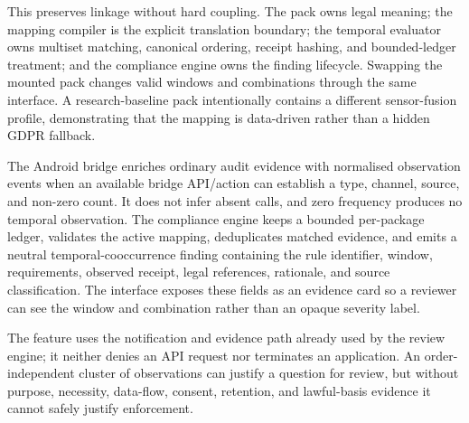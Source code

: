 This preserves linkage without hard coupling. The pack owns legal meaning; the mapping compiler is the explicit translation boundary; the temporal evaluator owns multiset matching, canonical ordering, receipt hashing, and bounded-ledger treatment; and the compliance engine owns the finding lifecycle. Swapping the mounted pack changes valid windows and combinations through the same interface. A research-baseline pack intentionally contains a different sensor-fusion profile, demonstrating that the mapping is data-driven rather than a hidden GDPR fallback.

The Android bridge enriches ordinary audit evidence with normalised observation events when an available bridge API/action can establish a type, channel, source, and non-zero count. It does not infer absent calls, and zero frequency produces no temporal observation. The compliance engine keeps a bounded per-package ledger, validates the active mapping, deduplicates matched evidence, and emits a neutral temporal-cooccurrence finding containing the rule identifier, window, requirements, observed receipt, legal references, rationale, and source classification. The interface exposes these fields as an evidence card so a reviewer can see the window and combination rather than an opaque severity label.

The feature uses the notification and evidence path already used by the review engine; it neither denies an API request nor terminates an application. An order-independent cluster of observations can justify a question for review, but without purpose, necessity, data-flow, consent, retention, and lawful-basis evidence it cannot safely justify enforcement.
